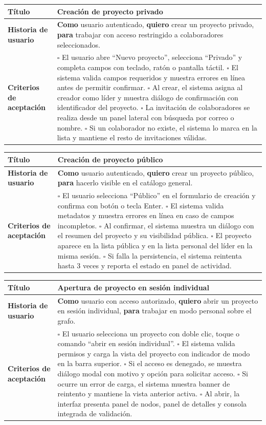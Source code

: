 \documentclass{article}
\newcommand{\story}[3]{
\begin{table}[H]
    \centering
    \begin{tabularx}{\textwidth}{| >{\raggedright\arraybackslash\bfseries\columncolor{leftheaderbg}}p{2.5cm} | >{\raggedright\arraybackslash\columncolor{contentbg}}X |}
        \hline
        Título & #1 \\
        \hline
        Historia de usuario & #2 \\
        \hline
        Criterios de aceptación & #3 \\
        \hline
    \end{tabularx}
\end{table}
}
\begin{document}
\story
{Creación de proyecto privado}
{\textbf{Como} usuario autenticado, \textbf{quiero} crear un proyecto privado, \textbf{para} trabajar con acceso restringido a colaboradores seleccionados.}
{$\square$ El usuario abre ``Nuevo proyecto'', selecciona ``Privado'' y completa campos con teclado, ratón o pantalla táctil. \newline
$\square$ El sistema valida campos requeridos y muestra errores en línea antes de permitir confirmar. \newline
$\square$ Al crear, el sistema asigna al creador como líder y muestra diálogo de confirmación con identificador del proyecto. \newline
$\square$ La invitación de colaboradores se realiza desde un panel lateral con búsqueda por correo o nombre. \newline
$\square$ Si un colaborador no existe, el sistema lo marca en la lista y mantiene el resto de invitaciones válidas.}

\story
{Creación de proyecto público}
{\textbf{Como} usuario autenticado, \textbf{quiero} crear un proyecto público, \textbf{para} hacerlo visible en el catálogo general.}
{$\square$ El usuario selecciona ``Público'' en el formulario de creación y confirma con botón o tecla Enter. \newline
$\square$ El sistema valida metadatos y muestra errores en línea en caso de campos incompletos. \newline
$\square$ Al confirmar, el sistema muestra un diálogo con el resumen del proyecto y su visibilidad pública. \newline
$\square$ El proyecto aparece en la lista pública y en la lista personal del líder en la misma sesión. \newline
$\square$ Si falla la persistencia, el sistema reintenta hasta 3 veces y reporta el estado en panel de actividad.}

\story
{Apertura de proyecto en sesión individual}
{\textbf{Como} usuario con acceso autorizado, \textbf{quiero} abrir un proyecto en sesión individual, \textbf{para} trabajar en modo personal sobre el grafo.}
{$\square$ El usuario selecciona un proyecto con doble clic, toque o comando ``abrir en sesión individual''. \newline
$\square$ El sistema valida permisos y carga la vista del proyecto con indicador de modo en la barra superior. \newline
$\square$ Si el acceso es denegado, se muestra diálogo modal con motivo y opción para solicitar acceso. \newline
$\square$ Si ocurre un error de carga, el sistema muestra banner de reintento y mantiene la vista anterior activa. \newline
$\square$ Al abrir, la interfaz presenta panel de nodos, panel de detalles y consola integrada de validación.}
\end{document}
